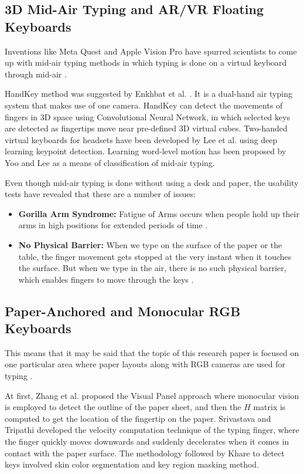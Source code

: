 \subsection{3D Mid-Air Typing and AR/VR Floating Keyboards}
\label{subsec:lit_air_systems}
Inventions like Meta Quest and Apple Vision Pro have spurred scientists to come up with mid-air typing methods in which typing is done on a virtual keyboard through mid-air \cite{Boletsis2019TextInput, Enkhbat2020HandKey, Lee2022Virtual, Yoo2026WordLevel}.

HandKey method was suggested by Enkhbat et al. \cite{Enkhbat2020HandKey}. It is a dual-hand air typing system that makes use of one camera. HandKey can detect the movements of fingers in 3D space using Convolutional Neural Network, in which selected keys are detected as fingertips move near pre-defined 3D virtual cubes. Two-handed virtual keyboards for headsets have been developed by Lee et al. \cite{Lee2022Virtual} using deep learning keypoint detection. Learning word-level motion has been proposed by Yoo and Lee \cite{Yoo2026WordLevel} as a means of classification of mid-air typing.

Even though mid-air typing is done without using a desk and paper, the usability tests have revealed that there are a number of issues:
\begin{itemize}
    \item \textbf{Gorilla Arm Syndrome:} Fatigue of Arms occurs when people hold up their arms in high positions for extended periods of time \cite{Boletsis2019TextInput}.
    \item \textbf{No Physical Barrier:} When we type on the surface of the paper or the table, the finger movement gets stopped at the very instant when it touches the surface. But when we type in the air, there is no such physical barrier, which enables fingers to move through the keys \cite{Boletsis2019TextInput, Maman2023TypeNet}.
\end{itemize}

\subsection{Paper-Anchored and Monocular RGB Keyboards}
\label{subsec:lit_paper_systems}
This means that it may be said that the topic of this research paper is focused on one particular area where paper layouts along with RGB cameras are used for typing \cite{Zhang2001Visual, Srivastava2012RealTime, Khare2019QWERTY, Maman2023TypeNet}.

At first, Zhang et al. \cite{Zhang2001Visual} proposed the Visual Panel approach where monocular vision is employed to detect the outline of the paper sheet, and then the $H$ matrix is computed to get the location of the fingertip on the paper. Srivastava and Tripathi \cite{Srivastava2012RealTime} developed the velocity computation technique of the typing finger, where the finger quickly moves downwards and suddenly decelerates when it comes in contact with the paper surface. The methodology followed by Khare \cite{Khare2019QWERTY} to detect keys involved skin color segmentation and key region masking method.

